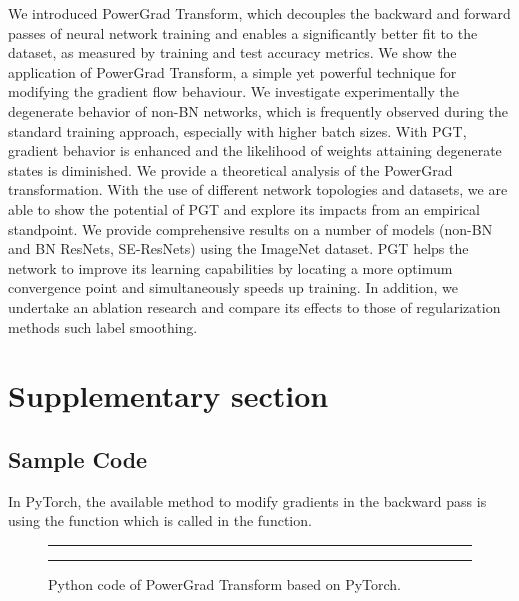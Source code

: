 \documentclass[times,sort&compress]{elsarticle}
\begin{document}
We introduced PowerGrad Transform, which decouples the backward and forward passes of
neural network training and enables a significantly better fit to the dataset, as
measured by training and test accuracy metrics. We show the application of PowerGrad
Transform, a simple yet powerful technique for modifying the gradient flow behaviour. We
investigate experimentally the degenerate behavior of non-BN networks, which is
frequently observed during the standard training approach, especially with higher batch
sizes. With PGT, gradient behavior is enhanced and the likelihood of weights attaining
degenerate states is diminished. We provide a theoretical analysis of the PowerGrad
transformation. With the use of different network topologies and datasets, we are able
to show the potential of PGT and explore its impacts from an empirical standpoint. We
provide comprehensive results on a number of models (non-BN and BN ResNets, SE-ResNets)
using the ImageNet dataset. PGT helps the network to improve its learning capabilities
by locating a more optimum convergence point and simultaneously speeds up training. In
addition, we undertake an ablation research and compare its effects to those of
regularization methods such label smoothing.






\clearpage



\section{Supplementary section}
\label{sec:Supp}




\subsection{Sample Code}

In PyTorch, the available method to modify gradients in the backward pass is using the
 function which is called in the  function.

\begin{figure}[ht] \hrule  \hrule
\vspace{0.1cm} \caption{Python code of PowerGrad Transform based on PyTorch. }
\label{fig:code}
\end{figure}
\end{document}
